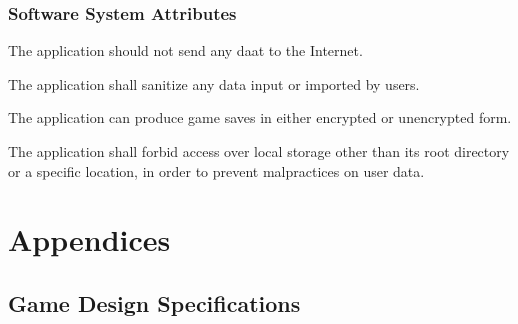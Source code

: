     \subsection{Software System Attributes}
      \begin{enumerate}[label=\texttt{[NFUNC-REQ-\arabic*]}:, leftmargin=10em]
        \item The application should not send any daat to the Internet.
        \item The application shall sanitize any data input or imported by users.
        \item The application can produce game saves in either encrypted or unencrypted form.
        \item The application shall forbid access over local storage other than its root directory or a specific location, in order to prevent malpractices on user data.
      \end{enumerate}

\chapter{Appendices}
\label{ch:apdx}

  \section{Game Design Specifications}
  \label{ch:game-design-specs}

